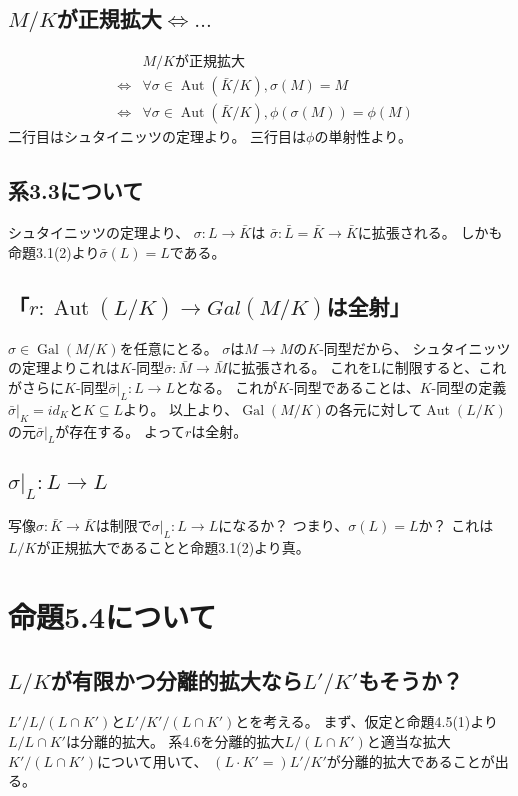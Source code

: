 \documentclass[a4j]{jarticle}
\newcommand{\Aut}{\operatorname{Aut}}
\newcommand{\Gal}{\operatorname{Gal}}
\begin{document}
        \subsection{$M/K$が正規拡大$\iff \dots$}
        \begin{eqnarray*}
            &{}& M/K\mbox{が正規拡大} \\
            &\iff& \forall \sigma \in \Aut(\bar{K}/K), \sigma(M)=M \\
            &\iff& \forall \sigma \in \Aut(\bar{K}/K), \phi(\sigma(M))=\phi(M)
        \end{eqnarray*}
        二行目はシュタイニッツの定理より。
        三行目は$\phi$の単射性より。

        \subsection{系3.3について}
        シュタイニッツの定理より、
        $\sigma : L \to \bar{K}$は
        $\bar{\sigma}:\bar{L}=\bar{K} \to \bar{K}$に拡張される。
        しかも命題3.1(2)より$\bar{\sigma}(L)=L$である。
        
        \subsection{「$r: \Aut(L/K) \to Gal(M/K)$は全射」}
        $\sigma \in \Gal(M/K)$を任意にとる。
        $\sigma$$はM \to M$の$K$-同型だから、
        シュタイニッツの定理よりこれは$K$-同型$\bar{\sigma}: \bar{M} \to \bar{M}$に拡張される。
        これをLに制限すると、これがさらに$K$-同型$\bar{\sigma}|_{L}:L \to L$となる。
        これが$K$-同型であることは、$K$-同型の定義$\bar{\sigma}|_{K}=id_K$と$K \subseteq L$より。
        以上より、$\Gal(M/K)$の各元に対して$\Aut(L/K)$の元$\bar{\sigma}|_{L}$が存在する。
        よって$r$は全射。
        
        \subsection{$\sigma|_L:L \to L$}
        写像$\sigma : \bar{K} \to \bar{K}$は制限で$\sigma|_L:L \to L$になるか？
        つまり、$\sigma(L)=L$か？
        これは$L/K$が正規拡大であることと命題3.1(2)より真。

    \section{命題5.4について}
        \subsection{$L/K$が有限かつ分離的拡大なら$L'/K'$もそうか？}
        $L'/L/(L \cap K')$と$L'/K'/(L \cap K')$とを考える。
        まず、仮定と命題4.5(1)より$L/L \cap K'$は分離的拡大。
        系4.6を分離的拡大$L/(L \cap K')$と適当な拡大$K'/(L \cap K')$について用いて、
        $(L \cdot K'=)L'/K'$が分離的拡大であることが出る。
\end{document}
